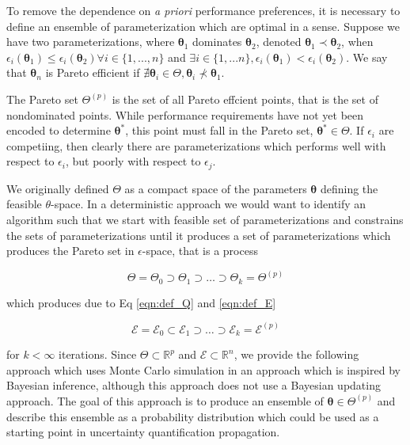 To remove the dependence on \emph{a priori} performance preferences, it is necessary to define an ensemble of parameterization which are optimal in a sense.  Suppose we have two parameterizations, where $\bm{\theta}_1$ dominates $\bm{\theta}_2$, denoted $\bm{\theta}_1 \prec \bm{\theta}_2$, when $\epsilon_i(\bm{\theta}_1) \leq \epsilon_i(\bm{\theta}_2) \forall i \in \{1,...,n\}$ and
$\exists i \in \{1,...n\}, \epsilon_i(\bm{\theta}_1) < \epsilon_i(\bm{\theta}_2)$.
We say that $\bm{\theta}_n$ is Pareto efficient if $\nexists \bm{\theta}_i \in \Theta, \bm{\theta}_i \nprec \bm{\theta}_1$.

The Pareto set $\Theta^{(p)}$ is the set of all Pareto effcient points, that is the set of nondominated points.  While performance requirements have not yet been encoded to determine $\bm{\theta}^*$, this point must fall in the Pareto set, $\bm{\theta}^* \in \Theta$.  If $\epsilon_i$ are competiing, then clearly there are parameterizations which performs well with respect to $\epsilon_i$, but poorly with respect to $\epsilon_j$.

We originally defined $\Theta$ as a compact space of the parameters ${\bm{\theta}}$ defining the feasible $\theta$-space.  In a deterministic approach we would want to identify an algorithm such that we start with feasible set of parameterizations and constrains the sets of parameterizations until it produces a set of parameterizations which produces the Pareto set in $\epsilon$-space, that is a process

\begin{equation}
    \Theta = \Theta_0 \supset \Theta_1 \supset \hdots \supset \Theta_k = \Theta^{(p)}
\end{equation}

which produces due to Eq \ref{eqn:def_Q} and \ref{eqn:def_E}

\begin{equation}
    \mathcal{E} = \mathcal{E}_0 \subset \mathcal{E}_1 \supset \hdots \supset \mathcal{E}_k = \mathcal{E}^{(p)}
\end{equation}

for $k < \infty$ iterations.  Since $\Theta \subset \mathbb{R}^p$ and $\mathcal{E} \subset \mathbb{R}^n$, we provide the following approach which uses Monte Carlo simulation in an approach which is inspired by Bayesian inference, although this approach does not use a Bayesian updating approach.  The goal of this approach is to produce an ensemble of $\bm{\theta}\in \Theta^{(p)}$ and describe this ensemble as a probability distribution which could be used as a starting point in uncertainty quantification propagation.


